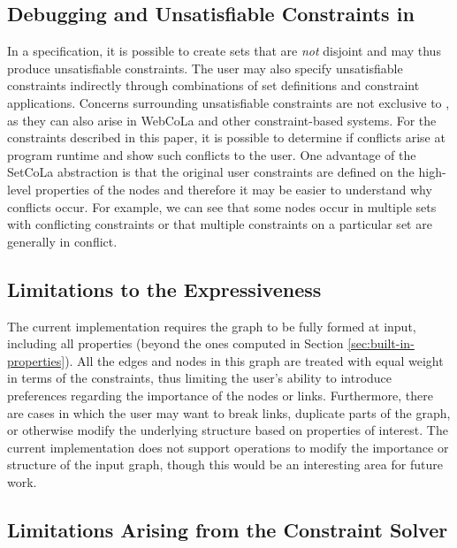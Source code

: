 \subsection{Debugging and Unsatisfiable Constraints in \projectname}
In a \projectname specification, it is possible to create sets that 
are \emph{not} disjoint and may thus produce unsatisfiable constraints. 
The user may also specify unsatisfiable constraints indirectly through
combinations of set definitions and constraint applications. Concerns surrounding
unsatisfiable constraints are not exclusive to \projectname, as they can also arise
in WebCoLa and other constraint-based systems. 
For the constraints described in this paper, it is possible to determine if
conflicts arise at program runtime and show such conflicts to the user. One
advantage of the SetCoLa abstraction is that the original user constraints
are defined on the high-level properties of the nodes and therefore it may
be easier to understand why conflicts occur. For example, we can see 
that some nodes occur in multiple sets with conflicting constraints
or that multiple constraints on a particular set are generally in conflict.

\vspace{-5px}
\subsection{Limitations to the Expressiveness}
The current \projectname implementation requires the graph to be fully formed
at input, including all properties (beyond the ones computed in Section 
\ref{sec:built-in-properties}). All the edges and nodes in this graph are
treated with equal weight in terms of the constraints, thus limiting the user's
ability to introduce preferences regarding the importance of the nodes or links. 
Furthermore, there are cases in which the user may want to break links, duplicate parts of 
the graph, or otherwise modify the underlying structure based on properties of interest.
The current \projectname implementation does not support operations to modify the
importance or structure of the input graph, though this would be an interesting
area for future work.  

\subsection{Limitations Arising from the Constraint Solver}

